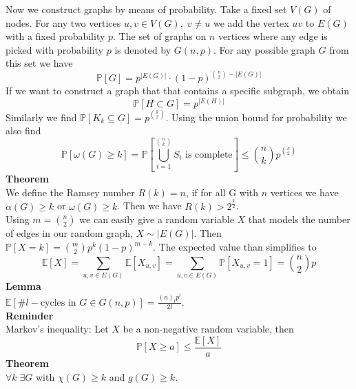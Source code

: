 \documentclass[a4paper, 12pt]{article}
\begin{document}
	Now we construct graphs by means of probability. Take a fixed set $V(G)$ of nodes. For any two vertices $u,v \in V(G), \; v \neq u$ we add the vertex $uv$ to $E(G)$ with a fixed probability $p$. The set of graphs on $n$ vertices where any edge is picked with probability $p$ is denoted by $G(n,p)$. For any possible graph $G$ from this set we have \[\mathbb{P}[G] = p^{\left|E(G)\right|} \cdot (1-p)^{\binom{n}{2}-\left|E(G)\right|}\] 
	If we want to construct a graph that that contains a specific subgraph, we obtain \[\mathbb{P}[H \subset G] = p^{\left|E(H)\right|}\]
	Similarly we find $\mathbb{P}[K_k \subseteq G] = p^{\binom{k}{2}}$.
	Using the union bound for probability we also find \[\mathbb{P}[\omega(G)\geq k] = \mathbb{P}\left[\bigcup_{i=1}^{\binom{n}{k}} S_i \text{ is complete}\right] \leq \binom{n}{k}p^{\binom{k}{2}}\] 
	\textbf{Theorem}\\
	We define the Ramsey number $R(k) = n$, if for all G with $n$ vertices we have $\alpha(G) \geq k$ or $\omega(G) \geq k$. Then we have $R(k) > 2^\frac{k}{2}$.\\
	
	Using $m = \binom{n}{2}$ we can easily give a random variable $X$ that models the number of edges in our random graph, $X \sim \left|E(G)\right|$. Then $\mathbb{P}[X = k] = \binom{m}{2}p^k(1-p)^{m-k}$. The expected value than simplifies to \[\mathbb{E}[X] = \sum_{u,v \in E(G)} \mathbb{E}[X_{u,v}] = \sum_{u,v \in E(G)} \mathbb{P}[X_{u,v} = 1] = \binom{n}{2}p\]
	\textbf{Lemma}\\
	$\mathbb{E}[\# l-\text{cycles in } G \in G(n,p)] = \frac{(n)_lp^l}{2l}$.\\
	\textbf{Reminder}\\
	Markov's inequality: Let $X$ be a non-negative random variable, then \[\mathbb{P}[X \geq a] \leq \frac{\mathbb{E}[X]}{a}\]
	\textbf{Theorem}\\
	$\forall k \; \exists G$ with $\chi(G) \geq k$ and $g(G) \geq k$.
\end{document}
